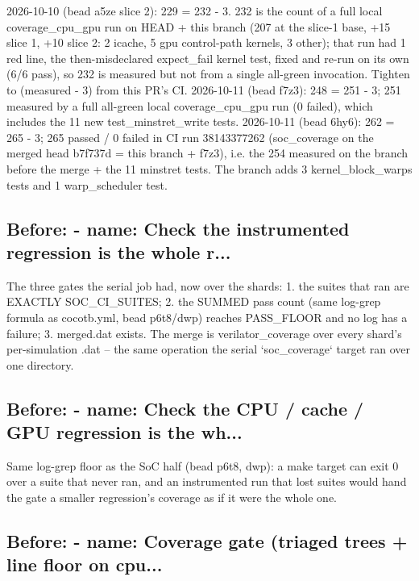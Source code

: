 \begin{record}
\begin{textblock}
2026-10-10 (bead a5ze slice 2): 229 = 232 - 3.  232 is the count of a full local
coverage_cpu_gpu run on HEAD + this branch (207 at the slice-1 base, +15 slice 1, +10 slice 2:
2 icache, 5 gpu control-path kernels, 3 other); that run had 1 red line, the then-misdeclared
expect_fail kernel test, fixed and re-run on its own (6/6 pass), so 232 is measured but not from a
single all-green invocation.  Tighten to (measured - 3) from this PR's CI.
2026-10-11 (bead f7z3): 248 = 251 - 3; 251 measured by a full all-green local coverage_cpu_gpu run
(0 failed), which includes the 11 new test_minstret_write tests.
2026-10-11 (bead 6hy6): 262 = 265 - 3; 265 passed / 0 failed in CI run 38143377262
(soc_coverage on the merged head b7f737d = this branch + f7z3), i.e. the 254 measured on the
branch before the merge + the 11 minstret tests.  The branch adds 3 kernel_block_warps tests
and 1 warp_scheduler test.
\end{textblock}

\subsection*{Before: - name: Check the instrumented regression is the whole r...}

\begin{textblock}
The three gates the serial job had, now over the shards:
 1. the suites that ran are EXACTLY SOC_CI_SUITES;
 2. the SUMMED pass count (same log-grep formula as cocotb.yml, bead p6t8/dwp) reaches
    PASS_FLOOR and no log has a failure;
 3. merged.dat exists.  The merge is verilator_coverage over every shard's per-simulation
    .dat -- the same operation the serial `soc_coverage` target ran over one directory.
\end{textblock}

\subsection*{Before: - name: Check the CPU / cache / GPU regression is the wh...}

\begin{textblock}
Same log-grep floor as the SoC half (bead p6t8, dwp): a make target can exit 0 over a
suite that never ran, and an instrumented run that lost suites would hand the gate a
smaller regression's coverage as if it were the whole one.
\end{textblock}

\subsection*{Before: - name: Coverage gate (triaged trees + line floor on cpu...}


\end{record}
